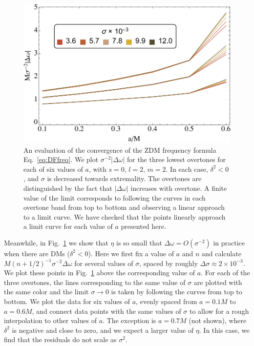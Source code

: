 \begin{refsection}
\begin{figure}[tb]
\includegraphics[width =1.0 \columnwidth]{chapter_extremal/etc/sigmaconvergence}
\caption{An evaluation of the convergence of the ZDM frequency formula Eq.~\eqref{eq:DFfreq}. We plot $\sigma^{-2}|\Delta\omega|$ for the three lowest overtones for each of six values of $a$, with $s=0$, $l=2$, $m=2$. In each case, $\delta^2<0$, and $\sigma$ is decreased towards extremality. The overtones are distinguished by the fact that $|\Delta\omega|$ increases with overtone. A finite value of the limit corresponds to following the curves in each overtone band from top to bottom and observing a linear approach to a limit curve. We have checked that the points linearly approach a limit curve for each value of $a$ presented here.}
\label{fig:errscale}
\end{figure}

Meanwhile, in Fig.~\ref{fig:errscale} we show that $\eta$ is so small that $\Delta\omega = O(\sigma^{-2})$ in practice when there are DMs ($\delta^2<0$). 
Here we first fix a value of $a$ and $n$ and calculate  $M (n+1/2)^{-1}\sigma^{-2}\Delta \omega$ for several values of $\sigma$, spaced by roughly $\Delta \sigma \approx 2 \times 10^{-3}$. 
We plot these points in Fig.~\ref{fig:errscale} above the corresponding value of $a$. 
For each of the three overtones, the lines corresponding to the same value of $\sigma$ are plotted with the same color and the limit  $\mathcal \sigma \to 0$ is taken by following the curves from top to bottom. 
We plot the data for six values of $a$, evenly spaced from $a = 0.1 M$ to $a = 0.6 M$, and connect  data points with the same values of $\sigma$ to allow for a rough interpolation to other values of $a$.
The exception is $a = 0.7M$ (not shown), where $\delta^2$ is negative and close to zero, and we expect a larger value of $\eta$. In this case, we find that the residuals do not scale as $\sigma^{2}$.


\end{refsection}
